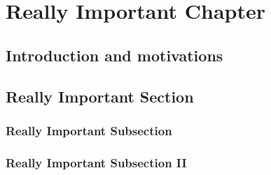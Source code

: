 \documentclass[debug]{phd}
\begin{document}
	\chapter{Really Important Chapter}
	\label{chapSugra}
		\section{Introduction and motivations}
						
			
		\section{Really Important Section}
			
			\subsection{Really Important Subsection}
				
			\subsection{Really Important Subsection II}
				

\end{document}
